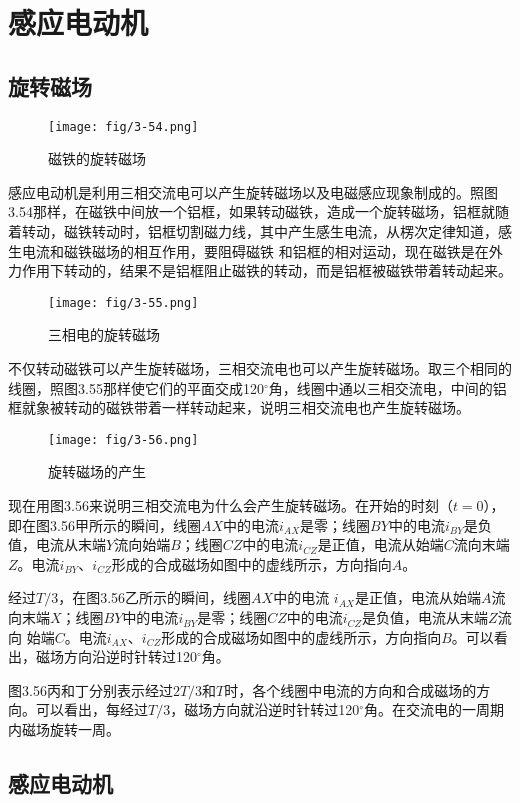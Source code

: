\section{感应电动机}
\subsection{旋转磁场}
\begin{figure}[htp]\centering
\texttt{[image: fig/3-54.png]}
\caption{磁铁的旋转磁场}
\end{figure}

感应电动机是利用三相交流电可以产生旋转磁场以及电磁感应现象制成的。照图3.54那样，在磁铁中间放一个铝框，如果转动磁铁，造成一个旋转磁场，铝框就随着转动，磁铁转动时，铝框切割磁力线，其中产生感生电流，从楞次定律知道，感生电流和磁铁磁场的相互作用，要阻碍磁铁
和铝框的相对运动，现在磁铁是在外力作用下转动的，结果不是铝框阻止磁铁的转动，而是铝框被磁铁带着转动起来。
\begin{figure}[htp]\centering
\texttt{[image: fig/3-55.png]}
\caption{三相电的旋转磁场}
\end{figure}

不仅转动磁铁可以产生旋转磁场，三相交流电也可以产生旋转磁场。取三个相同的线圈，照图3.55那样使它们的平面交成120$^\circ$角，线圈中通以三相交流电，中间的铝框就象被转动的磁铁带着一样转动起来，说明三相交流电也产生旋转磁场。
\begin{figure}[htp]\centering
\texttt{[image: fig/3-56.png]}
\caption{旋转磁场的产生}
\end{figure}

现在用图3.56来说明三相交流电为什么会产生旋转磁场。在开始的时刻（$t=0$），即在图3.56甲所示的瞬间，线圈$AX$中的电流$i_{AX}$是零；线圈$BY$中的电流$i_{BY}$是负值，电流从末端$Y$流向始端$B$；线圈$CZ$中的电流$i_{CZ}$是正值，电流从始端$C$流向末端$Z$。电流$i_{BY}$、$i_{CZ}$形成的合成磁场如图中的虚线所示，方向指向$A$。

经过$T/3$，在图3.56乙所示的瞬间，线圈$AX$中的电流
$i_{AX}$是正值，电流从始端$A$流向末端$X$；线圈$BY$中的电流$i_{BY}$是零；线圈$CZ$中的电流$i_{CZ}$是负值，电流从末端$Z$流向
始端$C$。电流$i_{AX}$、$i_{CZ}$形成的合成磁场如图中的虚线所示，方向指向$B$。可以看出，磁场方向沿逆时针转过120$^\circ$角。

图3.56丙和丁分别表示经过$2T/3$和$T$时，各个线圈中电流的方向和合成磁场的方向。可以看出，每经过$T/3$，磁场方向就沿逆时针转过120$^\circ$角。在交流电的一周期内磁场旋转一周。

\subsection{感应电动机}

